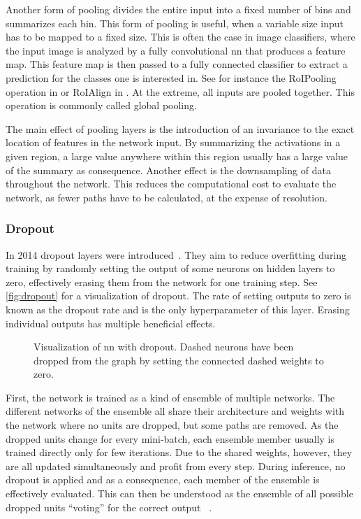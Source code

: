 Another form of pooling divides the entire input into a fixed number of bins and summarizes each bin. This form of pooling is useful, when a variable size input has to be mapped to a fixed size. This is often the case in image classifiers, where the input image is analyzed by a fully convolutional \acrshort{nn} that produces a feature map. This feature map is then passed to a fully connected classifier to extract a prediction for the classes one is interested in. See for instance the RoIPooling operation in \cite{Girshick:2015aaa} or RoIAlign in \cite{He:2017aaa}. At the extreme, all inputs are pooled together. This operation is commonly called global pooling.

The main effect of pooling layers is the introduction of an invariance to the exact location of features in the network input. By summarizing the activations in a given region, a large value anywhere within this region usually has a large value of the summary as consequence. Another effect is the downsampling of data throughout the network. This reduces the computational cost to evaluate the network, as fewer paths have to be calculated, at the expense of resolution.

\subsubsection{Dropout}
In 2014 dropout layers were introduced~\cite{Srivastava:2014aaa}. They aim to reduce overfitting during training by randomly setting the output of some neurons on hidden layers to zero, effectively erasing them from the network for one training step. See \autoref{fig:dropout} for a visualization of dropout. The rate of setting outputs to zero is known as the dropout rate and is the only hyperparameter of this layer. Erasing individual outputs has multiple beneficial effects.

\begin{figure}
	\centering
	
	\caption[Dropout]{Visualization of \acrshort{nn} with dropout. Dashed neurons have been dropped from the graph by setting the connected dashed weights to zero.}\label{fig:dropout}
\end{figure}

First, the network is trained as a kind of ensemble of multiple networks. The different networks of the ensemble all share their architecture and weights with the network where no units are dropped, but some paths are removed. As the dropped units change for every mini-batch, each ensemble member usually is trained directly only for few iterations. Due to the shared weights, however, they are all updated simultaneously and profit from every step. During inference, no dropout is applied and as a consequence, each member of the ensemble is effectively evaluated. This can then be understood as the ensemble of all possible dropped units ``voting'' for the correct output ~\cite{Goodfellow:2016:DNN}.

